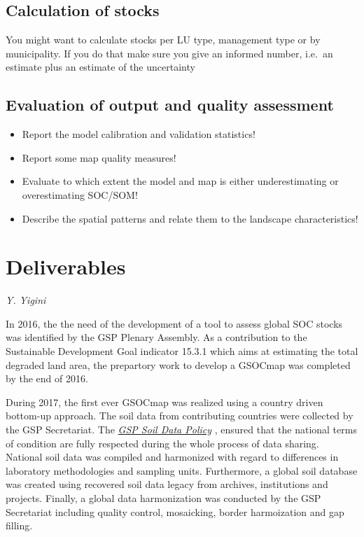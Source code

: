 \documentclass[10pt,b5paper,]{book}
\providecommand{\tightlist}{%
  \setlength{\itemsep}{0pt}\setlength{\parskip}{0pt}}
\theoremstyle{definition}
\theoremstyle{definition}
\theoremstyle{definition}
\theoremstyle{remark}
\begin{document}
\hypertarget{calculation-of-stocks}{%
\section{Calculation of stocks}\label{calculation-of-stocks}}

You might want to calculate stocks per LU type, management type or by
municipality. If you do that make sure you give an informed number,
i.e.~an estimate plus an estimate of the uncertainty

\hypertarget{evaluation-of-output-and-quality-assessment}{%
\section{Evaluation of output and quality
assessment}\label{evaluation-of-output-and-quality-assessment}}

\begin{itemize}
\tightlist
\item
  Report the model calibration and validation statistics!
\item
  Report some map quality measures!
\item
  Evaluate to which extent the model and map is either underestimating
  or overestimating SOC/SOM!
\item
  Describe the spatial patterns and relate them to the landscape
  characteristics!
\end{itemize}

\hypertarget{deliverables}{%
\chapter{Deliverables}\label{deliverables}}

\emph{Y. Yigini}

In 2016, the the need of the development of a tool to assess global SOC
stocks was identified by the GSP Plenary Assembly. As a contribution to
the Sustainable Development Goal indicator 15.3.1 which aims at
estimating the total degraded land area, the prepartory work to develop
a GSOCmap was completed by the end of 2016.

During 2017, the first ever GSOCmap was realized using a country driven
bottom-up approach. The soil data from contributing countries were
collected by the GSP Secretariat. The
\href{http://www.fao.org/3/a-bs975e.pdf}{\emph{GSP Soil Data Policy}}
\citep[see][Chapter 8.5]{gsp_data_2017}, ensured that the national terms
of condition are fully respected during the whole process of data
sharing. National soil data was compiled and harmonized with regard to
differences in laboratory methodologies and sampling units. Furthermore,
a global soil database was created using recovered soil data legacy from
archives, institutions and projects. Finally, a global data
harmonization was conducted by the GSP Secretariat including quality
control, mosaicking, border harmoization and gap filling.
\end{document}
